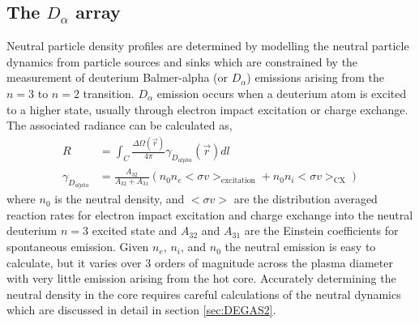 \subsection{The $D_{\alpha}$ array}\label{sec:dalpha_array}

Neutral particle density profiles are determined by modelling the neutral particle dynamics from particle sources and sinks which are constrained by the measurement of deuterium Balmer-alpha (or $D_{\alpha}$) emissions arising from the $n=3$ to $n=2$ transition. $D_{\alpha}$ emission occurs when a deuterium atom is excited to a higher state, usually through electron impact excitation or charge exchange. The associated radiance can be calculated as,
\begin{align}
    R &= \int_C \frac{\Delta \Omega(\vec{r})}{4\pi}\gamma_{D_{alpha}}(\vec{r}) dl\\
    \gamma_{D_{alpha}} &= \frac{A_{32}}{ A_{32} + A_{31} }\left( n_0 n_e <\sigma v>_{\text{excitation}} + n_0 n_i <\sigma v>_{\text{CX}} \right)
\end{align}
where $n_0$ is the neutral density, and $<\sigma v>$ are the distribution averaged reaction rates for electron impact excitation and charge exchange into the neutral deuterium $n=3$ excited state and $A_{32}$ and $A_{31}$ are the Einstein coefficients for spontaneous emission. Given $n_e$, $n_i$, and $n_0$ the neutral emission is easy to calculate, but it varies over $3$ orders of magnitude across the plasma diameter with very little emission arising from the hot core. Accurately determining the neutral density in the core requires careful calculations of the neutral dynamics which are discussed in detail in section \ref{sec:DEGAS2}.


